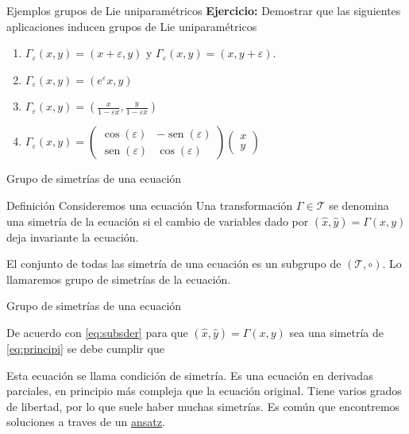 \documentclass[handout,hyperref={colorlinks=true}]{beamer}
\renewcommand{\emph}[1]{\textcolor[rgb]{1,0,0}{#1}}
\renewcommand{\epsilon}{\varepsilon}
\DeclareMathOperator{\sen}{sen}
\newcommand{\nl}{\onslide<+-> }
\begin{document}
\begin{frame}{Ejemplos grupos de Lie uniparamétricos}
\textbf{Ejercicio:} Demostrar que las siguientes aplicaciones inducen grupos de Lie uniparamétricos
\begin{enumerate}
\item<+-> $\Gamma_{\epsilon}(x,y)=(x+\epsilon,y)$ y $\Gamma_{\epsilon}(x,y)=(x,y+\epsilon)$.
\item<+-> $\Gamma_{\epsilon}(x,y)=(e^{\epsilon}x,y)$
\item<+->$\Gamma_{\epsilon}(x,y)=\left(\frac{x}{1-\epsilon x},\frac{y}{1-\epsilon x} \right)$
\item<+->$\Gamma_{\epsilon}(x,y)=\begin{pmatrix} \cos(\epsilon) & -\sen(\epsilon)
\\ \sen(\epsilon) & \cos(\epsilon)
\end{pmatrix} \begin{pmatrix} x\\ y
\end{pmatrix}
$
\end{enumerate}

\end{frame}



\begin{frame}{Grupo de simetrías de una ecuación}

\begin{block}{Definición}
\nl Consideremos una ecuación
Una transformación $\Gamma\in \mathscr{T}$ se denomina una simetría de la ecuación si el cambio de variables dado por $(\hat{x},\hat{y})=\Gamma(x,y)$ deja invariante  la ecuación. 

\nl El conjunto de todas las simetría de una ecuación es un subgrupo de  $( \mathscr{T},\circ)$. Lo llamaremos \emph{grupo de simetrías} de la ecuación.

 

\end{block}


\end{frame}


\begin{frame}{Grupo de simetrías de una ecuación}

\nl De acuerdo con \eqref{eq:subsder} para que $(\hat{x},\hat{y})=\Gamma(x,y)$ sea una simetría de \eqref{eq:principi} se debe cumplir que

\nl Esta ecuación se llama \emph{condición de simetría}. Es una ecuación en derivadas parciales, en principio más compleja que la ecuación original. Tiene varios grados de libertad, por lo que suele haber muchas simetrías.  Es común que encontremos soluciones a  traves de un  \href{http://es.wikipedia.org/wiki/Ansatz}{ansatz}.

\end{frame}
\end{document}
